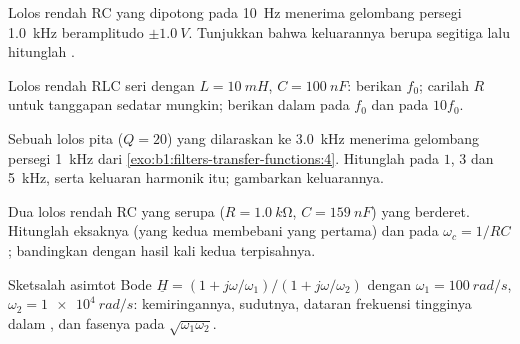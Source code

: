 \begin{exercise}[$\star\star$]\label{exo:b1:filters-transfer-functions:6}
Lolos rendah RC yang dipotong pada \qty{10}{Hz} menerima gelombang
persegi \qty{1.0}{kHz} beramplitudo $\pm\qty{1.0}{V}$. Tunjukkan bahwa
keluarannya berupa segitiga lalu hitunglah .
\end{exercise}

\begin{exercise}[$\star\star$]\label{exo:b1:filters-transfer-functions:7}
Lolos rendah RLC seri dengan $L = \qty{10}{mH}$, $C = \qty{100}{nF}$:
berikan $f_0$; carilah $R$ untuk tanggapan sedatar mungkin; berikan
 dalam  pada $f_0$ dan pada $10f_0$.
\end{exercise}

\begin{exercise}[$\star\star$]\label{exo:b1:filters-transfer-functions:8}
Sebuah lolos pita ($Q = 20$) yang dilaraskan ke \qty{3.0}{kHz} menerima
gelombang persegi \qty{1}{kHz} dari
\cref{exo:b1:filters-transfer-functions:4}. Hitunglah  pada
$1$, $3$ dan \qty{5}{kHz}, serta  keluaran harmonik itu;
gambarkan keluarannya.
\end{exercise}

\begin{exercise}[$\star\star$]\label{exo:b1:filters-transfer-functions:9}
Dua lolos rendah RC yang serupa ($R = \qty{1.0}{k\ohm}$, $C = \qty{159}{nF}$)
yang berderet. Hitunglah  eksaknya (yang kedua membebani yang
pertama) dan  pada $\omega_c = 1/RC$; bandingkan dengan
hasil kali kedua  terpisahnya.
\end{exercise}

\begin{exercise}[$\star\star\star$]\label{exo:b1:filters-transfer-functions:10}
Sketsalah asimtot Bode $\underline H = (1 + j\omega/\omega_1)/
(1 + j\omega/\omega_2)$ dengan $\omega_1 = \qty{100}{rad/s}$, $\omega_2 =
\qty{1e4}{rad/s}$: kemiringannya, sudutnya, dataran frekuensi tingginya
dalam , dan fasenya pada $\sqrt{\omega_1\omega_2}$.
\end{exercise}

